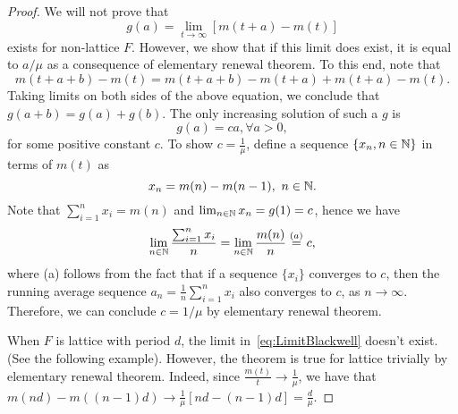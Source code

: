 \documentclass[a4paper,10pt,english]{article}
\begin{document}
\begin{proof} 
We will not prove that 
\begin{equation}
\label{eq:LimitBlackwell}
g(a) = \lim_{t \to \infty} [m(t+a) - m(t)]
\end{equation}exists for non-lattice $F$. However, we show that if this limit does exist, it is equal to $a/\mu$ as a consequence of elementary renewal theorem. To this end, note that
\begin{equation*}
m(t+a+b) - m(t) = m(t+a+b) - m(t+a) + m(t+a) - m(t).
\end{equation*}
Taking limits on both sides of the above equation, we conclude that $g(a+b) = g(a) +  g(b)$. The only increasing solution of such a $g$ is
\begin{equation*}
g(a) = ca, \forall a > 0,
\end{equation*}
for some positive constant $c$. To show $c = \frac{1}{\mu}$, define a sequence $\{x_n, n \in \mathbb{N}\}$ in terms of $m(t)$ as 
\begin{equation*}
x_n = m(n) - m(n-1),~n \in \mathbb{N}.
\end{equation*}
Note that $\sum_{i=1}^nx_i = m(n)$ and $\lim_{n \in \mathbb{N}}x_n = g(1) = c$, hence we have
\begin{equation*}
\lim_{n \in \mathbb{N}}\frac{\sum_{i=1}^nx_i}{n} = \lim_{n \in \mathbb{N}}\frac{m(n)}{n} \stackrel{(a)}{=} c,
\end{equation*}
where (a) follows from the fact that if a sequence $\{x_i\}$ converges to $c$, then the running average sequence $a_n = \frac{1}{n}\sum_{i=1}^n x_i$ also converges to $c$, as $n \to \infty$. 
Therefore, we can conclude $c = 1/\mu$ by elementary renewal theorem.

When $F$ is lattice with period $d$, the limit in~\eqref{eq:LimitBlackwell} doesn't exist. (See the following example). %
However, the theorem is true for lattice trivially by elementary renewal theorem. Indeed, since $\frac{m(t)}{t} \to \frac{1}{\mu}$, we have that $m(nd)-m((n-1)d) \to \frac{1}{\mu}[nd-(n-1)d] = \frac{d}{\mu}.$
\end{proof}
\end{document}
